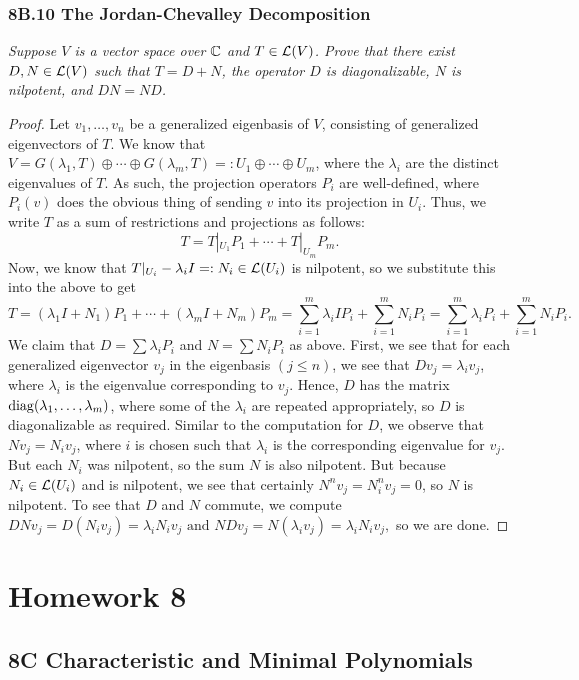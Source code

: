 \documentclass{article}
\begin{document}
\subsubsection*{8B.10 The Jordan-Chevalley Decomposition}
\textit{Suppose $V$ is a vector space over $\mathbb C$ and $T\in\mathcal L(V)$. Prove that there exist $D, N\in\mathcal L(V)$ such that $T = D+N$, the operator $D$ is diagonalizable, $N$ is nilpotent, and $DN = ND$.}
\begin{proof}
Let $v_1, \ldots, v_n$ be a generalized eigenbasis of $V$, consisting of generalized eigenvectors of $T$. We know that $V = G(\lambda_1, T)\oplus \cdots \oplus G(\lambda_m, T)=: U_1 \oplus\cdots\oplus U_m$, where the $\lambda_i$ are the distinct eigenvalues of $T$. As such, the projection operators $P_i$ are well-defined, where $P_i(v)$ does the obvious thing of sending $v$ into its projection in $U_i$. Thus, we write $T$ as a sum of restrictions and projections as follows:
$$T = T|_{U_1}P_1 + \cdots + T|_{U_m}P_m.$$
Now, we know that $T|_{U_i}-\lambda_i I=:N_i \in \mathcal L(U_i)$ is nilpotent, so we substitute this into the above to get
$$T = (\lambda_1I+N_1)P_1 + \cdots + (\lambda_mI+N_m)P_m =\sum_{i=1}^m \lambda_iIP_i + \sum_{i=1}^m N_iP_i = \sum_{i=1}^m \lambda_iP_i + \sum_{i=1}^m N_iP_i.$$
We claim that $D = \sum \lambda_iP_i$ and $N = \sum N_iP_i$ as above. First, we see that for each generalized eigenvector $v_j$ in the eigenbasis $(j\leq n)$, we see that $Dv_j = \lambda_i v_j$, where $\lambda_i$ is the eigenvalue corresponding to $v_j$. Hence, $D$ has the matrix $\operatorname{diag}(\lambda_1,\ldots, \lambda_m)$, where some of the $\lambda_i$ are repeated appropriately, so $D$ is diagonalizable as required. Similar to the computation for $D$, we observe that $Nv_j = N_iv_j$, where $i$ is chosen such that $\lambda_i$ is the corresponding eigenvalue for $v_j$. But each $N_i$ was nilpotent, so the sum $N$ is also nilpotent. But because $N_i\in\mathcal L(U_i)$ and is nilpotent, we see that certainly $N^nv_j = N_i^nv_j = 0$, so $N$ is nilpotent. To see that $D$ and $N$ commute, we compute $DNv_j = D(N_iv_j) = \lambda_iN_iv_j \textrm{ and } NDv_j = N(\lambda_iv_j) = \lambda_iN_iv_j,$ so we are done.
\end{proof}
\section*{Homework 8}
\subsection*{8C Characteristic and Minimal Polynomials}
\end{document}
